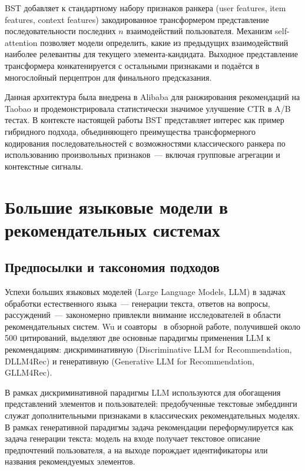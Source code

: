 BST добавляет к стандартному набору признаков ранкера (user features, item features, context features) закодированное трансформером представление последовательности последних $n$ взаимодействий пользователя. Механизм self-attention позволяет модели определить, какие из предыдущих взаимодействий наиболее релевантны для текущего элемента-кандидата. Выходное представление трансформера конкатенируется с остальными признаками и подаётся в многослойный перцептрон для финального предсказания.

Данная архитектура была внедрена в Alibaba для ранжирования рекомендаций на Taobao и продемонстрировала статистически значимое улучшение CTR в A/B тестах. В контексте настоящей работы BST представляет интерес как пример гибридного подхода, объединяющего преимущества трансформерного кодирования последовательностей с возможностями классического ранкера по использованию произвольных признаков~--- включая групповые агрегации и контекстные сигналы.

\section{Большие языковые модели в рекомендательных системах}

\subsection{Предпосылки и таксономия подходов}

Успехи больших языковых моделей (Large Language Models, LLM) в задачах обработки естественного языка~--- генерации текста, ответов на вопросы, рассуждений~--- закономерно привлекли внимание исследователей в области рекомендательных систем. Wu и соавторы~\cite{wu2023survey_llm4rec} в обзорной работе, получившей около 500 цитирований, выделяют две основные парадигмы применения LLM к рекомендациям: дискриминативную (Discriminative LLM for Recommendation, DLLM4Rec) и генеративную (Generative LLM for Recommendation, GLLM4Rec).

В рамках дискриминативной парадигмы LLM используются для обогащения представлений элементов и пользователей: предобученные текстовые эмбеддинги служат дополнительными признаками в классических рекомендательных моделях. В рамках генеративной парадигмы задача рекомендации переформулируется как задача генерации текста: модель на входе получает текстовое описание предпочтений пользователя, а на выходе порождает идентификаторы или названия рекомендуемых элементов.

